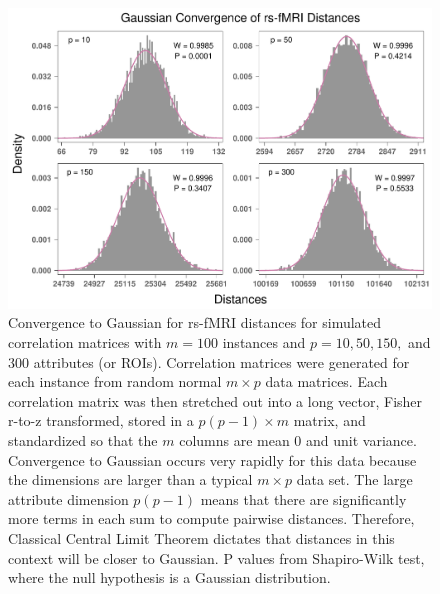 \documentclass[10pt,letterpaper]{article}\usepackage[]{graphicx}\usepackage[]{color}
\begin{document}
\begin{figure}[H]
	\includegraphics[width=\textwidth]{central_limit_hist_rs-fMRI_standard.pdf}
	\caption{Convergence to Gaussian for rs-fMRI distances for simulated correlation matrices with $m=100$ instances and $p=10, 50, 150,$ and $300$ attributes (or ROIs). Correlation matrices were generated for each instance from random normal $m \times p$ data matrices. Each correlation matrix was then stretched out into a long vector, Fisher r-to-z transformed, stored in a $p(p-1) \times m$ matrix, and standardized so that the $m$ columns are mean 0 and unit variance. Convergence to Gaussian occurs very rapidly for this data because the dimensions are larger than a typical $m \times p$ data set. The large attribute dimension $p(p-1)$ means that there are significantly more terms in each sum to compute pairwise distances. Therefore, Classical Central Limit Theorem dictates that distances in this context will be closer to Gaussian. P values from Shapiro-Wilk test, where the null hypothesis is a Gaussian distribution.}
\end{figure}
\end{document}
